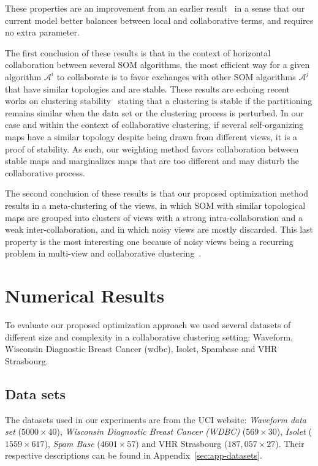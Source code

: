 These properties are an improvement from an earlier result~\cite{Sublime2017} in a sense that our current model better balances between local and collaborative terms, and requires no extra parameter.

The first conclusion of these results is that in the context of horizontal collaboration between several SOM algorithms, the most efficient way for a given algorithm $\mathcal{A}^i$ to collaborate is to favor exchanges with other SOM algorithms $\mathcal{A}^j$ that have similar topologies and are stable. These results are echoing recent works on clustering stability~\cite{stability2,vonLuxburg:2010:CSO:1774730.1774731} stating that  a clustering is stable if the partitioning remains similar when the data set or the clustering process is perturbed. 
In our case and within the context of collaborative clustering, if several self-organizing maps have a similar topology despite being drawn from different views, it is a proof of stability. As such, our weighting method favors collaboration between stable maps and marginalizes maps that are too different and may disturb the collaborative process.


The second conclusion of these results is that our proposed optimization method results in a meta-clustering of the views, in which SOM with similar topological maps are grouped into clusters of views with a strong intra-collaboration and a weak inter-collaboration, and in which noisy views are mostly discarded. This last property is the most interesting one because of noisy views being a recurring problem in multi-view and collaborative clustering~\cite{Cornuejols201881}.





\section{Numerical Results} 
\label{app:c}

To evaluate our proposed optimization approach we used several datasets of different size and complexity in a collaborative clustering setting: Waveform, Wisconsin Diagnostic Breast Cancer (wdbc), Isolet, Spambase and VHR Strasbourg.

\subsection{Data sets}
The datasets used in our experiments are from the UCI website: \textit{Waveform data set} ($5000 \times 40$), \textit{Wisconsin Diagnostic Breast Cancer (WDBC)} ($569 \times 30$), \textit{Isolet} ($1559 \times 617$), \textit{Spam Base} ($4601 \times 57$) and VHR Strasbourg ($187,057 \times 27$). Their respective descriptions can be found in Appendix~\ref{sec:app-datasets}.\\


